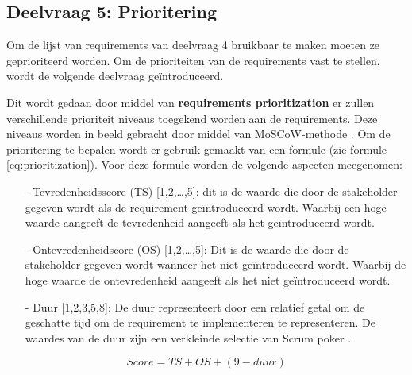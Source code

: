 \subsection{Deelvraag 5: Prioritering}
Om de lijst van requirements van deelvraag 4 bruikbaar te maken moeten ze geprioriteerd worden.
Om de prioriteiten van de requirements vast te stellen, wordt de volgende deelvraag geïntroduceerd.

\begin{center}
	\textit{\SubquestionFive}
\end{center}

\whitespace[0.2]
Dit wordt gedaan door middel van \textbf{requirements prioritization} er zullen verschillende prioriteit niveaus toegekend worden aan de requirements.
Deze niveaus worden in beeld gebracht door middel van MoSCoW-methode \Parencite{MoSCoW}.
Om de prioritering te bepalen wordt er gebruik gemaakt van een formule (zie formule \ref{eq:prioritization}).
Voor deze formule worden de volgende aspecten meegenomen:
\begin{enumerate}
	\item[-] Tevredenheidsscore (TS) [1,2,\ldots,5]: dit is de waarde die door de stakeholder gegeven wordt als de requirement geïntroduceerd wordt.
	      Waarbij een hoge waarde aangeeft de tevredenheid aangeeft als het geïntroduceerd wordt.
	\item[-] Ontevredenheidscore (OS) [1,2,\dots,5]: Dit is de waarde die door de stakeholder gegeven wordt wanneer het niet geïntroduceerd wordt.
	      Waarbij de hoge waarde de ontevredenheid aangeeft als het niet geïntroduceerd wordt.
	\item[-] Duur [1,2,3,5,8]: De duur representeert door een relatief getal om de geschatte tijd om de requirement te implementeren te representeren.
	      De waardes van de duur zijn een verkleinde selectie van Scrum poker \Parencite{ScrumPoker}.
\end{enumerate}

\whitespace
\begin{equation}
	\label{eq:prioritization}
	Score = TS + OS + (9 - duur)
\end{equation}

